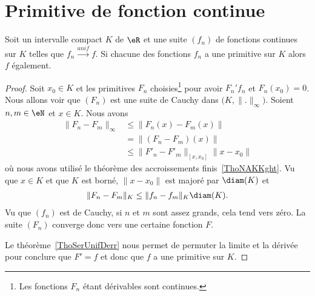 \section{Primitive de fonction continue}

\begin{proposition}    \label{PropQACVooBnHtRJ}
    Soit un intervalle compact \( K\) de \( \eR\) et une suite \( (f_n)\) de fonctions continues sur \( K\) telles que \( f_n\stackrel{unif}{\longrightarrow}f\). Si chacune des fonctions \( f_n\) a une primitive sur \( K\) alors \( f\) également.
\end{proposition}

\begin{proof}
    Soit \( x_0\in K\) et les primitives \( F_n\) choisies\footnote{Les fonctions \( F_n\) étant dérivables sont continues.} pour avoir \( F_n'f_n\) et \( F_n(x_0)=0\). Nous allons voir que \( (F_n)\) est une suite de Cauchy dans \( \big( K,\| . \|_{\infty} \big)\). Soient \( n,m\in \eN\) et \( x\in K\). Nous avons
    \begin{subequations}
        \begin{align}
            \| F_n-F_m \|_{\infty}&\leq \| F_n(x)-F_m(x) \|\\
            &=\| (F_n-F_m)(x) \|\\
            &\leq \| F'_n-F'_m \|_{[x,x_0]}\| x-x_0 \|
        \end{align}
    \end{subequations}
    où nous avons utilisé le théorème des accroissements finis~\ref{ThoNAKKght}. Vu que \( x\in K\) et que \( K\) est borné, \( \| x-x_0 \|\) est majoré par \( \diam(K)\) et
    \begin{subequations}
        \begin{align}
            \| F_n-F_m \|_K\leq \| f_n-f_m \|_K\diam(K).
        \end{align}
    \end{subequations}
    Vu que \( (f_n) \) est de Cauchy, si \( n\) et \( m\) sont assez grands, cela tend vers zéro. La suite \( (F_n)\) converge donc vers une certaine fonction \( F\).

    Le théorème~\ref{ThoSerUnifDerr} nous permet de permuter la limite et la dérivée pour conclure que \( F'=f\) et donc que \( f\) a une primitive sur \( K\).
\end{proof}

